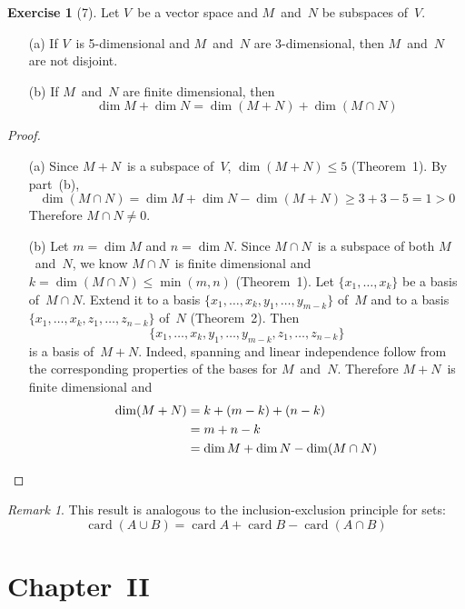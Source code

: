 \documentclass[letterpaper,12pt]{article}
\newcommand{\union}{\cup}
\newcommand{\sect}{\cap}
\DeclareMathOperator{\card}{card}
\theoremstyle{definition}
\newtheorem*{exer}{Exercise}
\theoremstyle{remark}
\newtheorem*{rmk}{Remark}
\theoremstyle{direction}
\begin{document}
\begin{exer}[7]
Let \(V\)~be a vector space and \(M\)~and~\(N\) be subspaces of~\(V\).
\begin{enumerate}
\item[(a)] If \(V\)~is 5-dimensional and \(M\)~and~\(N\) are 3-dimensional, then \(M\)~and~\(N\) are not disjoint.
\item[(b)] If \(M\)~and~\(N\) are finite dimensional, then
\[\dim M+\dim N=\dim(M+N)+\dim(M\sect N)\]
\end{enumerate}
\end{exer}
\begin{proof}\
\begin{enumerate}
\item[(a)] Since \(M+N\)~is a subspace of~\(V\), \(\dim(M+N)\le5\) (Theorem~1). By part~(b),
\[\dim(M\sect N)=\dim M+\dim N-\dim(M+N)\ge3+3-5=1>0\]
Therefore \(M\sect N\ne0\).
\item[(b)] Let \(m=\dim M\) and \(n=\dim N\). Since \(M\sect N\)~is a subspace of both \(M\)~and~\(N\), we know \(M\sect N\)~is finite dimensional and \(k=\dim(M\sect N)\le\min(m,n)\) (Theorem~1). Let \(\{x_1,\ldots,x_k\}\) be a basis of~\(M\sect N\). Extend it to a basis \(\{x_1,\ldots,x_k,y_1,\ldots,y_{m-k}\}\) of~\(M\) and to a basis \(\{x_1,\ldots,x_k,z_1,\ldots,z_{n-k}\}\) of~\(N\) (Theorem~2). Then
\[\{x_1,\ldots,x_k,y_1,\ldots,y_{m-k},z_1,\ldots,z_{n-k}\}\]
is a basis of~\(M+N\). Indeed, spanning and linear independence follow from the corresponding properties of the bases for \(M\)~and~\(N\). Therefore \(M+N\)~is finite dimensional and
\begin{align*}
\dim(M+N)&=k+(m-k)+(n-k)\\
	&=m+n-k\\
	&=\dim M+\dim N-\dim(M\sect N)\qedhere
\end{align*}
\end{enumerate}
\end{proof}
\begin{rmk}
This result is analogous to the inclusion-exclusion principle for sets:
\[\card(A\union B)=\card A+\card B-\card(A\sect B)\]
\end{rmk}
\section*{Chapter~II}
\end{document}
